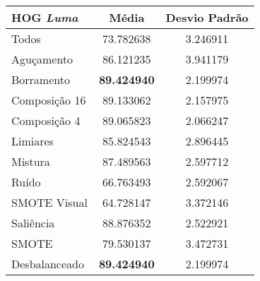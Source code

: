 

\begin{table}[!htbp]
\centering
\caption{}
\label{tab:resultados:x:melhor}
\begin{tabular}{|l|c|c|}
\hline
\textbf{HOG \emph{Luma}} & \textbf{Média}     & \textbf{Desvio Padrão} \\ \hline
   Todos        &  73.782638 &  3.246911  \\ \hline
  Aguçamento    &  86.121235 &  3.941179  \\ \hline
  Borramento    &  \textbf{89.424940} &  2.199974  \\ \hline
  Composição 16 &  89.133062 &  2.157975  \\ \hline
  Composição 4  &  89.065823 &  2.066247  \\ \hline
  Limiares      &  85.824543 &  2.896445  \\ \hline
  Mistura       &  87.489563 &  2.597712  \\ \hline
  Ruído         &  66.763493 &  2.592067  \\ \hline
  SMOTE Visual  &  64.728147 &  3.372146  \\ \hline
  Saliência     &  88.876352 &  2.522921  \\ \hline
 SMOTE          &  79.530137 &  3.472731  \\ \hline
Desbalanceado   &  \textbf{89.424940} &  2.199974  \\ \hline
\end{tabular}
\end{table}

